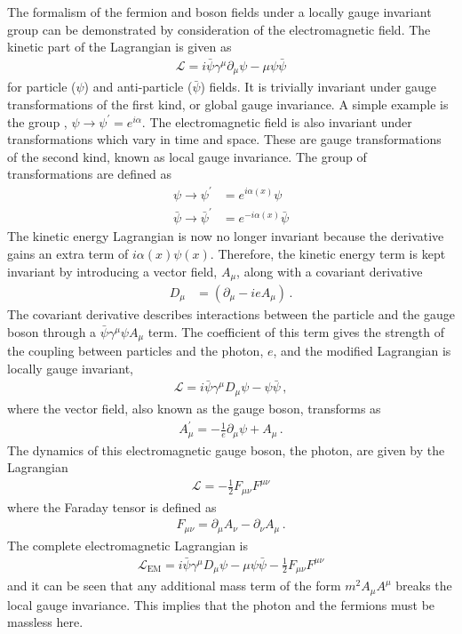 The formalism of the fermion and boson fields under a locally gauge invariant group can be demonstrated 
by consideration of the electromagnetic field.
The kinetic part of the Lagrangian is given as 
\begin{align}
\mathcal{L} = i\bar{\psi}\gamma^\mu\partial_\mu\psi - \mu \psi\bar{\psi}
\end{align}
for particle ($\psi$) and anti-particle ($\bar{\psi}$) fields.
It is trivially invariant under gauge transformations of the first kind, or global gauge invariance.
A simple example is the group \grpuone, $\psi \to \psi^{'} = e^{i\alpha} $.
The electromagnetic field is also invariant under transformations which vary in time and space. 
These are gauge transformations of the second kind, known as local gauge invariance.
The group of transformations are defined as
\begin{align}
\psi \to \psi^{'} &= e^{i\alpha(x)} \psi \\
\bar{\psi} \to \bar{\psi}^{'} &= e^{-i\alpha(x)}\bar{\psi}
\end{align}
The kinetic energy Lagrangian is now no longer invariant because the derivative gains an extra 
term of $i\alpha(x)\psi(x)$.
Therefore, the kinetic energy term is kept invariant by introducing 
 a vector field, $A_\mu$, along with a covariant derivative 
\begin{align}
D_\mu &= \left( \partial_\mu - i e A_\mu \right) \, .
\end{align}
The covariant derivative describes interactions between the particle and the gauge boson through
a $ \bar{\psi}\gamma^\mu\psi A_\mu $ term.
The coefficient of this term gives the strength of the coupling between particles and the photon, $e$,
and the modified Lagrangian is locally gauge invariant,
\begin{align}
\mathcal{L} = i\bar{\psi}\gamma^\mu D_\mu\psi - \psi\bar{\psi} \, ,
\end{align}
where the vector field, also known as the gauge boson, transforms as 
\begin{align}
A_\mu^{'} = - \frac{1}{e} \partial_\mu\psi + A_\mu \, .  
\end{align}
The dynamics of this electromagnetic gauge boson, the photon, are given by the Lagrangian
\begin{align}
\mathcal{L} = - \frac{1}{2} F_{\mu\nu} F^{\mu\nu}
\end{align}
where the Faraday tensor is defined as 
\begin{align}
F_{\mu\nu} = \partial_\mu A_\nu - \partial_\nu A_\mu \, .
\end{align}
The complete electromagnetic Lagrangian is  
\begin{align}
\mathcal{L}_{\mathrm{EM}} =  i\bar{\psi}\gamma^\mu D_\mu\psi - \mu \psi\bar{\psi}    - \frac{1}{2} F_{\mu\nu} F^{\mu\nu}
\end{align}
and it can be seen that any additional mass term of the form $m^2 A_\mu A^\mu$ breaks the
local gauge invariance. This implies that the photon and the fermions must be massless here.

